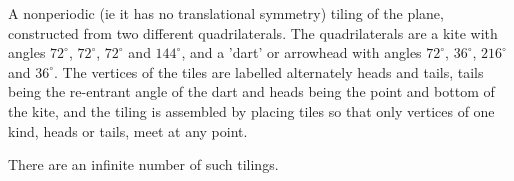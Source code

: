  A nonperiodic (ie it has no translational symmetry) tiling of the 
plane, constructed from two different quadrilaterals. The quadrilaterals are
a kite with angles $72^{\circ}$, $72^{\circ}$, $72^{\circ}$ and $144^{\circ}$, and a
'dart' or arrowhead with angles $72^{\circ}$, $36^{\circ}$, $216^{\circ}$ and $36^{\circ}$.
The vertices of the tiles are labelled alternately heads and tails,
tails being the re-entrant angle of the dart and heads being the point
and bottom of the kite, and the tiling is assembled by placing tiles
so that only vertices of one kind, heads or tails, meet at any point.
\par
There are an infinite number of such tilings.
